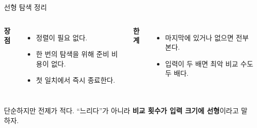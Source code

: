 \begin{frame}{선형 탐색 정리}
  \begin{columns}[T,onlytextwidth]
      \textbf{장점}
      \begin{itemize}
        \item 정렬이 필요 없다.
        \item 한 번의 탐색을 위해 준비 비용이 없다.
        \item 첫 일치에서 즉시 종료한다.
      \end{itemize}
      \textbf{한계}
      \begin{itemize}
        \item 마지막에 있거나 없으면 전부 본다.
        \item 입력이 두 배면 최악 비교 수도 두 배다.
      \end{itemize}
  \end{columns}
  \begin{takeaway}단순하지만 전제가 적다. ``느리다''가 아니라 \textbf{비교 횟수가 입력 크기에 선형}이라고 말하자.\end{takeaway}
\end{frame}
